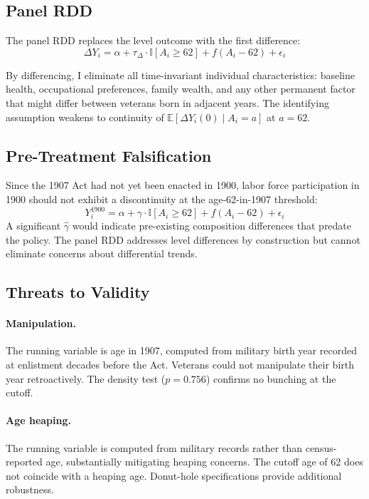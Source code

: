 \documentclass[12pt]{article}
\newcommand{\E}{\mathbb{E}}
\newcommand{\ind}{\mathbb{I}}
\begin{document}
\subsection{Panel RDD}

The panel RDD replaces the level outcome with the first difference:
\begin{equation}
\Delta Y_i = \alpha + \tau_\Delta \cdot \ind[A_i \geq 62] + f(A_i - 62) + \epsilon_i
\end{equation}

By differencing, I eliminate all time-invariant individual characteristics: baseline health, occupational preferences, family wealth, and any other permanent factor that might differ between veterans born in adjacent years. The identifying assumption weakens to continuity of $\E[\Delta Y_i(0) \mid A_i = a]$ at $a = 62$.

\subsection{Pre-Treatment Falsification}

Since the 1907 Act had not yet been enacted in 1900, labor force participation in 1900 should not exhibit a discontinuity at the age-62-in-1907 threshold:
\begin{equation}
Y_i^{1900} = \alpha + \gamma \cdot \ind[A_i \geq 62] + f(A_i - 62) + \epsilon_i
\end{equation}
A significant $\hat{\gamma}$ would indicate pre-existing composition differences that predate the policy. The panel RDD addresses level differences by construction but cannot eliminate concerns about differential trends.

\subsection{Threats to Validity}
\label{sec:threats}

\paragraph{Manipulation.} The running variable is age in 1907, computed from military birth year recorded at enlistment decades before the Act. Veterans could not manipulate their birth year retroactively. The density test ($p = 0.756$) confirms no bunching at the cutoff.

\paragraph{Age heaping.} The running variable is computed from military records rather than census-reported age, substantially mitigating heaping concerns. The cutoff age of 62 does not coincide with a heaping age. Donut-hole specifications provide additional robustness.
\end{document}
